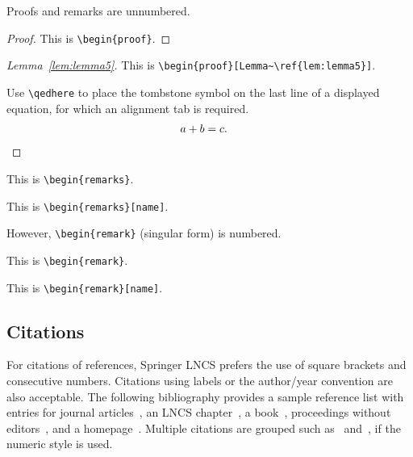\noindent
Proofs and remarks are unnumbered.

\begin{proof}
This is \texttt{\textbackslash begin\{proof\}}.
\end{proof}

\begin{proof}[Lemma~\ref{lem:lemma5}]
This is \texttt{\textbackslash begin\{proof\}[Lemma\textasciitilde\textbackslash ref\{lem:lemma5\}]}.

Use \texttt{\textbackslash qedhere} to place the tombstone symbol
on the last line of a displayed equation,
for which an alignment tab is required.
\begin{align*}
a+b&{}=c.
\qedhere
\end{align*}
\end{proof}

\begin{remarks}
This is \texttt{\textbackslash begin\{remarks\}}.
\end{remarks}

\begin{remarks}[name]
This is \texttt{\textbackslash begin\{remarks\}[name]}.
\end{remarks}

\noindent
However, \texttt{\textbackslash begin\{remark\}} (singular form) is numbered.

\begin{remark}
This is \texttt{\textbackslash begin\{remark\}}.
\end{remark}

\begin{remark}[name]
This is \texttt{\textbackslash begin\{remark\}[name]}.
\end{remark}

\subsection{Citations}

For citations of references, Springer LNCS prefers the use of square brackets
and consecutive numbers. Citations using labels or the author/year
convention are also acceptable. The following bibliography provides
a sample reference list with entries for journal
articles~\cite{ref_article1}, an LNCS chapter~\cite{ref_lncs1}, a
book~\cite{ref_book1}, proceedings without editors~\cite{ref_proc1},
and a homepage~\cite{ref_url1}. Multiple citations are grouped
such as~\cite{ref_article1,ref_lncs1,ref_book1}
and~\cite{ref_article1,ref_book1,ref_proc1,ref_url1},
if the numeric style is used.

